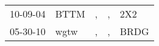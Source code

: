 \begin{supertabular}{lllll}
 10-09-04 &  BTTM &  , &  , &   2X2 \\
 05-30-10 &  wgtw &  , &  , &  BRDG \\
\end{supertabular}

